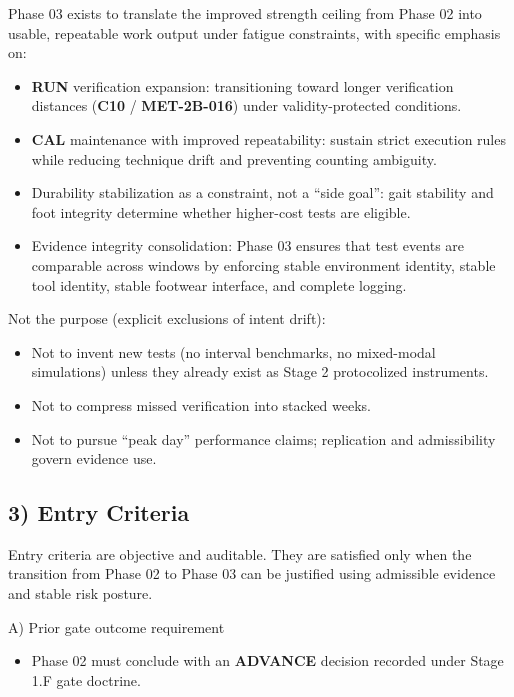 \documentclass[10pt]{article}
\begin{document}
Phase 03 exists to translate the improved strength ceiling from Phase 02 into usable, repeatable work output under fatigue constraints, with specific emphasis on:

\begin{itemize}
\item \textbf{RUN} verification expansion: transitioning toward longer verification distances (\textbf{C10} / \textbf{MET-2B-016}) under validity-protected conditions.
\item \textbf{CAL} maintenance with improved repeatability: sustain strict execution rules while reducing technique drift and preventing counting ambiguity.
\item Durability stabilization as a constraint, not a “side goal”: gait stability and foot integrity determine whether higher-cost tests are eligible.
\item Evidence integrity consolidation: Phase 03 ensures that test events are comparable across windows by enforcing stable environment identity, stable tool identity, stable footwear interface, and complete logging.
\end{itemize}

Not the purpose (explicit exclusions of intent drift):

\begin{itemize}
\item Not to invent new tests (no interval benchmarks, no mixed-modal simulations) unless they already exist as Stage 2 protocolized instruments.
\item Not to compress missed verification into stacked weeks.
\item Not to pursue “peak day” performance claims; replication and admissibility govern evidence use.
\end{itemize}

\subsection*{3) Entry Criteria}

Entry criteria are objective and auditable. They are satisfied only when the transition from Phase 02 to Phase 03 can be justified using admissible evidence and stable risk posture.

A) Prior gate outcome requirement

\begin{itemize}
\item Phase 02 must conclude with an \textbf{ADVANCE} decision recorded under Stage 1.F gate doctrine.
\end{itemize}
\end{document}

